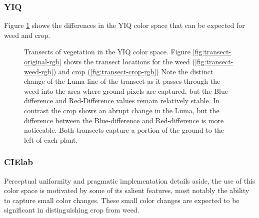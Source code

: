 \documentclass[letterpaper]{report}
\begin{document}
\subsubsection{YIQ}
Figure \ref{fig:transects-yiq} shows the differences in the YIQ color space that can be expected for weed and crop.

\begin{figure}[!htb]
	\centering
	\hfill
	\hfill
	\caption[YIQ Transects]{Transects of vegetation in the YIQ color space. Figure \ref{fig:transect-original-rgb} shows the transect locations for the weed (\ref{fig:transect-weed-rgb}) and crop (\ref{fig:transect-crop-rgb}) Note the distinct change of the Luma line of the transect as it passes through the weed into the area where ground pixels are captured, but the Blue-difference and Red-Difference values remain relatively stable.  In contrast the crop shows an abrupt change in the Luma, but the difference between the Blue-difference and Red-difference is more noticeable. Both transects capture a portion of the ground to the left of each plant.}
	\label{fig:transects-yiq}
\end{figure}


\subsubsection{CIElab}
Perceptual uniformity and pragmatic implementation details aside, the use of this color space is motivated by some of its salient features, most notably the ability to capture small color changes. These small color changes are expected to be significant in distinguishing crop from weed.
\end{document}
